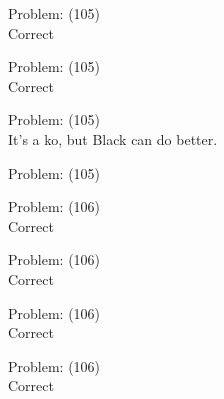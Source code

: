 \documentclass[11pt]{article}
\begin{document}
\begin{minipage}[t]{0.5\textwidth}
  {\centering
  
Problem: (105)\\
Correct\\
  }
\end{minipage}
\begin{minipage}[t]{0.5\textwidth}
  {\centering
  
Problem: (105)\\
Correct\\
  }
\end{minipage}
\begin{minipage}[t]{0.5\textwidth}
  {\centering
  
Problem: (105)\\
It's a ko, but Black can do better.\\
  }
\end{minipage}
\begin{minipage}[t]{0.5\textwidth}
  {\centering
  
Problem: (105)\\
  }
\end{minipage}
\begin{minipage}[t]{0.5\textwidth}
  {\centering
  
Problem: (106)\\
Correct\\
  }
\end{minipage}
\begin{minipage}[t]{0.5\textwidth}
  {\centering
  
Problem: (106)\\
Correct\\
  }
\end{minipage}
\begin{minipage}[t]{0.5\textwidth}
  {\centering
  
Problem: (106)\\
Correct\\
  }
\end{minipage}
\begin{minipage}[t]{0.5\textwidth}
  {\centering
  
Problem: (106)\\
Correct\\
  }
\end{minipage}
\end{document}
